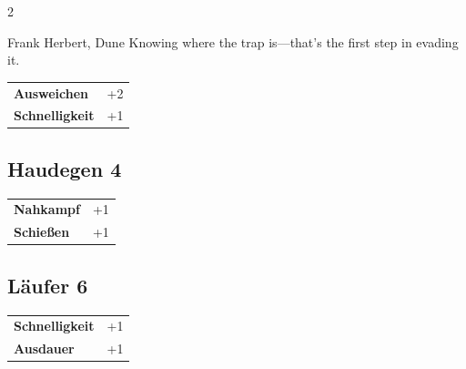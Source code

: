\begin{multicols}{2}
\begin{tcolorbox}
\begin{pquote}{Frank Herbert, Dune}
Knowing where the trap is—that's the first step in evading it.
\end{pquote}

\vspace{3mm}

\begin{tabular}{@{}ll@{}}
    \textbf{Ausweichen} & +2\\
    \textbf{Schnelligkeit} & +1\\
\end{tabular}


\end{tcolorbox}

\begin{tcolorbox}
    \subsection*{Haudegen \hfill \small{4 }}
    \tcblower




\begin{tabular}{@{}ll@{}}
    \textbf{Nahkampf} & +1\\
    \textbf{Schießen} & +1\\
\end{tabular}


\end{tcolorbox}

\begin{tcolorbox}
    \subsection*{Läufer \hfill \small{6 }}
    \tcblower




\begin{tabular}{@{}ll@{}}
    \textbf{Schnelligkeit} & +1\\
    \textbf{Ausdauer} & +1\\
\end{tabular}



\end{tcolorbox}
\end{multicols}
